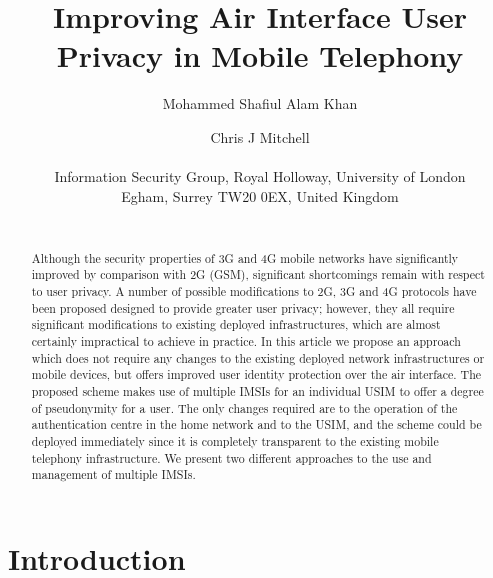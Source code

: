 \documentclass{acm_proc_article-sp}
\begin{document}
\title{Improving Air Interface User Privacy in Mobile Telephony}

\author{Mohammed Shafiul Alam Khan \and Chris J Mitchell\\\\Information Security Group, Royal Holloway,
University of London\\Egham, Surrey TW20 0EX, United Kingdom\\\\
}

\maketitle

\begin{abstract}

Although the security properties of 3G and 4G mobile networks have significantly improved by comparison with 2G (GSM), significant shortcomings remain with respect to user privacy. A number of possible modifications to 2G, 3G and 4G protocols have been proposed designed to provide greater user privacy; however, they all require significant modifications to existing deployed infrastructures, which are almost certainly impractical to achieve in practice. In this article we propose an approach which does not require any changes to the existing deployed network infrastructures or mobile devices, but offers improved user identity protection over the air interface. The proposed scheme makes use of multiple IMSIs for an individual USIM to offer a degree of pseudonymity for a user. The only changes required are to the operation of the authentication centre in the home network and to the USIM, and the scheme could be deployed immediately since it is completely transparent to the existing mobile telephony infrastructure. We present two different approaches to the use and management of multiple IMSIs. 

\end{abstract}







\section{Introduction}
\end{document}
